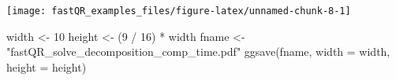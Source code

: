\documentclass[]{tufte-handout}
\newenvironment{Shaded}{}{}
\newcommand{\AttributeTok}[1]{\textcolor[rgb]{0.49,0.56,0.16}{#1}}
\newcommand{\DecValTok}[1]{\textcolor[rgb]{0.25,0.63,0.44}{#1}}
\newcommand{\FunctionTok}[1]{\textcolor[rgb]{0.02,0.16,0.49}{#1}}
\newcommand{\NormalTok}[1]{#1}
\newcommand{\OtherTok}[1]{\textcolor[rgb]{0.00,0.44,0.13}{#1}}
\newcommand{\SpecialCharTok}[1]{\textcolor[rgb]{0.25,0.44,0.63}{#1}}
\newcommand{\StringTok}[1]{\textcolor[rgb]{0.25,0.44,0.63}{#1}}
\begin{document}
\texttt{[image: fastQR\_examples\_files/figure-latex/unnamed-chunk-8-1]}

\begin{Shaded}
\begin{Highlighting}[]
\NormalTok{width   }\OtherTok{\textless{}{-}} \DecValTok{10}
\NormalTok{height  }\OtherTok{\textless{}{-}}\NormalTok{ (}\DecValTok{9} \SpecialCharTok{/} \DecValTok{16}\NormalTok{) }\SpecialCharTok{*}\NormalTok{ width}
\NormalTok{fname   }\OtherTok{\textless{}{-}} \StringTok{"fastQR\_solve\_decomposition\_comp\_time.pdf"}
\FunctionTok{ggsave}\NormalTok{(fname, }\AttributeTok{width =}\NormalTok{ width, }\AttributeTok{height =}\NormalTok{ height)}
\end{Highlighting}
\end{Shaded}



\end{document}
